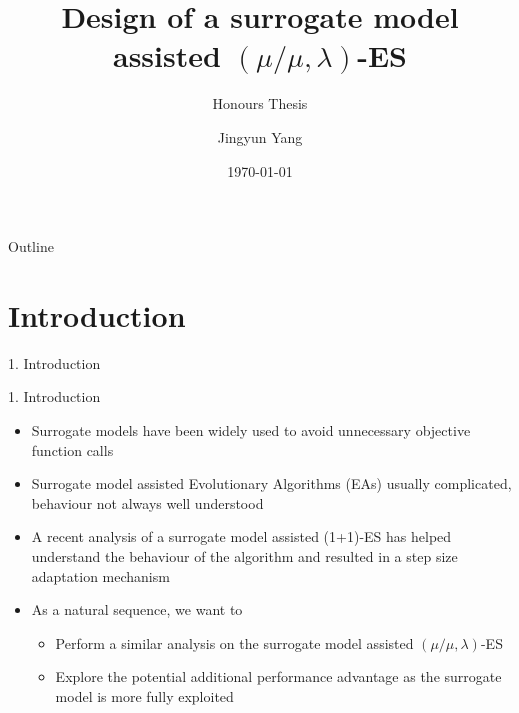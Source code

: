 \documentclass{beamer}
\title{Design of a surrogate model assisted $(\mu/\mu,\lambda)$-ES}
\subtitle{Honours Thesis}
\author{Jingyun Yang}
\institute{Faculty of Computer Science\\ Dalhousie University\\ jingyun.yang@dal.ca}
\date{\today}
\begin{document}
\begin{frame}
  \titlepage
\end{frame}


\begin{frame}{Outline}
  \tableofcontents
\end{frame}


\section{Introduction}


\begin{frame}[plain,c]
\begin{center}
\Huge 1. Introduction
\end{center}
\end{frame}


\begin{frame}{1. Introduction}
  \begin{itemize}
    \item Surrogate models have been widely used to avoid unnecessary objective function calls
    \item Surrogate model assisted Evolutionary Algorithms (EAs) usually complicated, behaviour not always well understood
    \item A recent analysis of a surrogate model assisted (1+1)-ES has helped understand the behaviour of the algorithm and resulted in a step size adaptation mechanism   
    \item As a natural sequence, we want to 
    \begin{itemize}
      \item Perform a similar analysis on the surrogate model assisted $(\mu/\mu,\lambda)$-ES
      \item Explore the potential additional performance advantage as the surrogate model is more fully exploited 
      
    \end{itemize}
  \end{itemize}
\end{frame}
\end{document}
